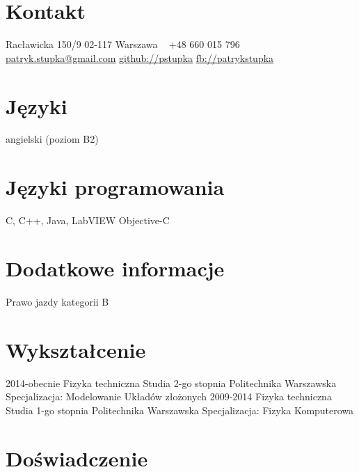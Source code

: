 \documentclass[]{friggeri-cv} %
\begin{document}

\begin{aside} %
\section{Kontakt}
Racławicka 150/9
02-117 Warszawa
~
+48 660 015 796
~
\href{mailto:patryk.stupka@gmail.com}{patryk.stupka@gmail.com}
\href{https://github.com/pstupka/}{github://pstupka}
\href{http://facebook.com/patrykstupka}{fb://patrykstupka}
\section{Języki}
angielski (poziom B2)
\section{Języki programowania}
C, C++, Java, LabVIEW
Objective-C
\section{Dodatkowe informacje}
Prawo jazdy kategorii B
\end{aside}

\section{Wykształcenie}

\begin{entrylist}
\entry
	{2014-obecnie}
	{Fizyka techniczna {\normalfont Studia 2-go stopnia}}
	{Politechnika Warszawska}
	{Specjalizacja: Modelowanie Układów złożonych}
\entry
	{2009-2014}
	{Fizyka techniczna {\normalfont Studia 1-go stopnia}}
	{Politechnika Warszawska}
	{Specjalizacja: Fizyka Komputerowa}
\end{entrylist}


\section{Doświadczenie}
\end{document}
